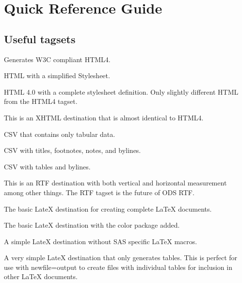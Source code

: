 \chapter{Quick Reference Guide}
\section{Useful tagsets}

\begin{description}


Generates W3C compliant HTML4.


HTML with a simplified Stylesheet.


HTML 4.0 with a complete stylesheet definition.
Only slightly different HTML from the HTML4 tagset.


This is an XHTML destination that is almost identical
to HTML4.


CSV that contains only tabular data.


CSV with titles, footnotes, notes, and bylines.


CSV with tables and bylines.


This is an RTF destination with both vertical and horizontal 
measurement among other things.  The RTF tagset is the future
of ODS RTF.


The basic LateX destination for creating complete LaTeX documents.


The basic LateX destination with the color package added.


A simple LateX destination without SAS specific LaTeX macros.


A very simple LateX destination that only generates tables.
This is perfect for use with newfile=output to create files
with individual tables for inclusion in other LaTeX documents.


\end{description}
